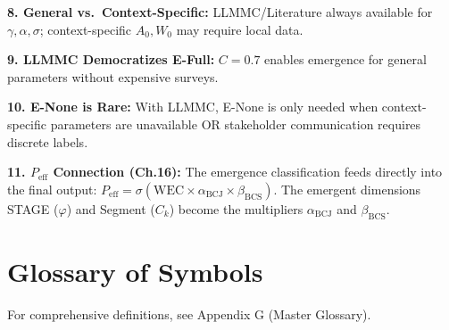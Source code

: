 \begin{tcolorbox}[colback=blue!5!white, colframe=blue!75!black,
    title=\textbf{Key Takeaways: Emergent Intervention Theory}]
\textbf{8. General vs.\ Context-Specific:} LLMMC/Literature always available for $\gamma, \alpha, \sigma$; context-specific $A_0, W_0$ may require local data.

\textbf{9. LLMMC Democratizes E-Full:} $C = 0.7$ enables emergence for general parameters without expensive surveys.

\textbf{10. E-None is Rare:} With LLMMC, E-None is only needed when context-specific parameters are unavailable OR stakeholder communication requires discrete labels.

\textbf{11. $P_{\text{eff}}$ Connection (Ch.16):} The emergence classification feeds directly into the final output: $P_{\text{eff}} = \sigma(\text{WEC} \times \alpha_{\text{BCJ}} \times \beta_{\text{BCS}})$. The emergent dimensions STAGE ($\varphi$) and Segment ($C_k$) become the multipliers $\alpha_{\text{BCJ}}$ and $\beta_{\text{BCS}}$.
\end{tcolorbox}


\section{Glossary of Symbols}
\label{sec:ie-glossary}

For comprehensive definitions, see Appendix G (Master Glossary).


